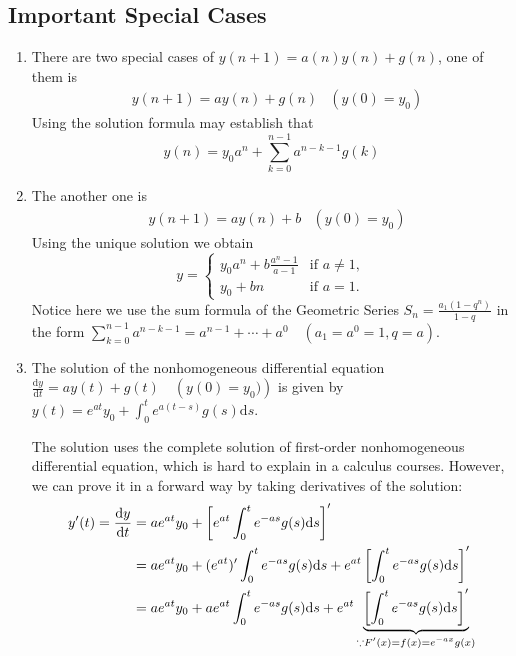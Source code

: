 \subsection{Important Special Cases}
\begin{enumerate}
    \item There are two special cases of $y(n+1)=a(n)y(n)+g(n)$, one of them is
        \begin{align*} & y(n+1)=ay(n)+g(n) & \left(y(0)=y_0\right) \end{align*}
        Using the solution formula may establish that
        \[y(n)=y_0a^n+\sum_{k=0}^{n-1} a^{n-k-1}g(k)\]
    \item The another one is
        \begin{align*} & y(n+1)=ay(n)+b & \left(y(0)=y_0\right) \end{align*}
        Using the unique solution we obtain
        \[
            y= \begin{cases}
                y_0a^n +b\frac{a^n-1}{a-1} & \text{if }a\neq 1, \\
                y_0+bn                    & \text{if }a=1.
            \end{cases}
        \]
        Notice here we use the sum formula of the Geometric Series $S_n=\frac{a_1(1-q^n)}{1-q}$ in the form $\sum_{k=0}^{n-1} a^{n-k-1}=a^{n-1}+\cdots+a^0\quad\left(a_1=a^0=1, q=a\right)$.
    \item The solution of the nonhomogeneous differential equation $\frac{\mathrm{d}y}{\mathrm{d}t}=ay(t)+g(t)\quad\left(y(0)=y_0)\right)$ is given by $y(t)=e^{at}y_0+\int_0^t e^{a(t-s)}g(s)\mathrm{d}s$.
        \begin{explanation}
            The solution uses the complete solution of first-order nonhomogeneous differential equation, which is hard to explain in a calculus courses. However, we can prove it in a forward way by taking derivatives of the solution:
            \begin{align*}
                y^\prime(t)=\frac{\mathrm{d}y}{\mathrm{d}t} & =ae^{at}y_0+\left[e^{at}\int_0^t e^{-as}g(s)\mathrm{d}s\right]^\prime \\
                & =ae^{at}y_0+(e^{at})^\prime\int_0^t e^{-as}g(s)\mathrm{d}s+e^{at}\left[\int_0^t e^{-as}g(s)\mathrm{d}s\right]^\prime \\
                & =ae^{at}y_0+ae^{at}\int_0^t e^{-as}g(s)\mathrm{d}s+e^{at}\underbrace{\left[\int_0^t e^{-as}g(s)\mathrm{d}s\right]^\prime}_{\begin{subarray}{l}
                        \because F^\prime(x)=f(x)=e^{-ax}g(x) \\

\end{subarray}}
\end{align*}
\end{explanation}
\end{enumerate}
